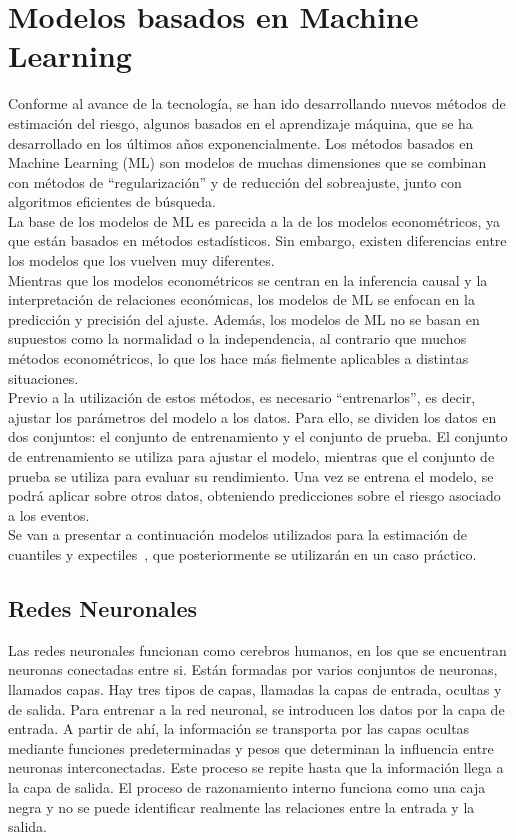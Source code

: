 \documentclass[11pt]{book}
\theoremstyle{plain} %
\theoremstyle{definition} %
\begin{document}
\section{Modelos basados en Machine Learning}
Conforme al avance de la tecnología, se han ido desarrollando nuevos métodos de 
estimación del riesgo, algunos basados en el aprendizaje máquina, que se ha desarrollado 
en los últimos años exponencialmente. Los métodos basados en Machine Learning (ML) 
son modelos de muchas dimensiones que se combinan con métodos de “regularización” y 
de reducción del sobreajuste, junto con algoritmos eficientes de búsqueda.\\

La base de los modelos de ML es parecida a la de los modelos econométricos, ya que están 
basados en métodos estadísticos. Sin embargo, existen diferencias entre los modelos que 
los vuelven muy diferentes.\\

Mientras que los modelos econométricos se centran en la inferencia causal y la 
interpretación de relaciones económicas, los modelos de ML se enfocan en la predicción 
y precisión del ajuste. Además, los modelos de ML no se basan en supuestos como la 
normalidad o la independencia, al contrario que muchos métodos econométricos, lo que 
los hace más fielmente aplicables a distintas situaciones. \\

Previo a la utilización de estos métodos, es necesario “entrenarlos”, es decir, ajustar los 
parámetros del modelo a los datos. Para ello, se dividen los datos en dos conjuntos: el 
conjunto de entrenamiento y el conjunto de prueba. El conjunto de entrenamiento se 
utiliza para ajustar el modelo, mientras que el conjunto de prueba se utiliza para evaluar 
su rendimiento. Una vez se entrena el modelo, se podrá aplicar sobre otros datos, 
obteniendo predicciones sobre el riesgo asociado a los eventos.\\

Se van a presentar a continuación modelos utilizados para la estimación de cuantiles y 
expectiles~\cite{HTF17}, que posteriormente se utilizarán en un caso práctico.

\subsection{Redes Neuronales}
Las redes neuronales funcionan como cerebros humanos, en los que se encuentran 
neuronas conectadas entre si. Están formadas por varios conjuntos de neuronas, llamados capas.  Hay tres tipos de capas, llamadas la capas de entrada, ocultas y de salida. 
Para entrenar a la red neuronal, se introducen los datos por la capa de entrada. A partir de 
ahí, la información se transporta por las capas ocultas mediante funciones predeterminadas 
y pesos que determinan la influencia entre neuronas interconectadas. Este proceso se 
repite hasta que la información llega a la capa de salida. El proceso de razonamiento 
interno funciona como una caja negra y no se puede identificar realmente las relaciones 
entre la entrada y la salida. \\
\end{document}
